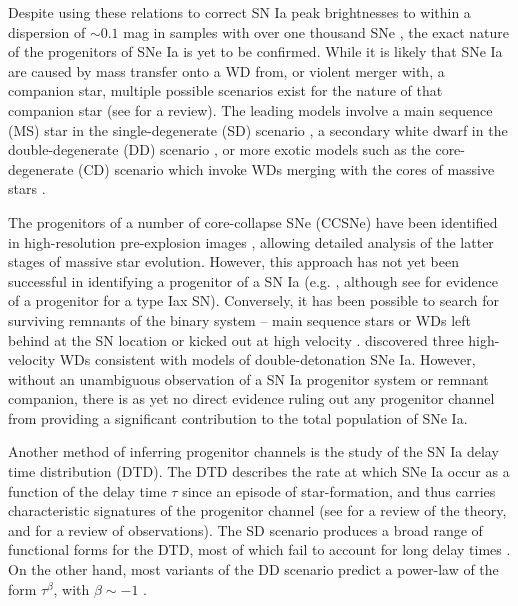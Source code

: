 \documentclass[fleqn,usenatbib]{mnras}
\begin{document}
Despite using these relations to correct SN Ia peak brightnesses to within a dispersion of $\sim 0.1$ mag in samples with over one thousand SNe \citep{Scolnic2018}, the exact nature of the progenitors of SNe Ia is yet to be confirmed. While it is likely that SNe Ia are caused by mass transfer onto a WD from, or violent merger with, a companion star, multiple possible scenarios exist for the nature of that companion star (see \citealt{Maoz2014} for a review). The leading models involve a main sequence (MS) star in the single-degenerate (SD) scenario \citep{Whelan1973,Nomoto1982}, a secondary white dwarf in the double-degenerate (DD) scenario \citep{Tutukov1976,Iben1984,Webbink1984}, or more exotic models such as the core-degenerate (CD) scenario which invoke WDs merging with the cores of massive stars \citep{Soker2019}. 

The progenitors of a number of core-collapse SNe (CCSNe) have been identified in high-resolution pre-explosion images \citep{Smartt2009,Eldridge2013}, allowing detailed analysis of the latter stages of massive star evolution. However, this approach has not yet been successful in identifying a progenitor of a SN Ia (e.g. \citealt{Graur2014a,Kelly2014,Graur2019}, although see \citet{McCully2014} for evidence of a progenitor for a type Iax SN). Conversely, it has been possible to search for surviving remnants of the binary system -- main sequence stars or WDs left behind at the SN location or kicked out at high velocity \citep[e.g.][]{Schaefer2012,RuizLapuente2012,Kerzendorf2018,Kerzendorf2019}. \citet{Shen2018} discovered three high-velocity WDs consistent with models of double-detonation SNe Ia. However, without an unambiguous observation of a SN Ia progenitor system or remnant companion, there is as yet no direct evidence ruling out any progenitor channel from providing a significant contribution to the total population of SNe Ia.

Another method of inferring progenitor channels is the study of the SN Ia delay time distribution (DTD). The DTD describes the rate at which SNe Ia occur as a function of the delay time $\tau$ since an episode of star-formation, and thus carries characteristic signatures of the progenitor channel (see \citealt{Wang2012} for a review of the theory, and \citet{Maoz2017} for a review of observations). The SD scenario produces a broad range of functional forms for the DTD, most of which fail to account for long delay times \citep{Graur2014}. On the other hand, most variants of the DD scenario predict a power-law of the form $\tau^{\beta}$, with $\beta \sim -1$ \citep[e.g][]{Ruiter2009,Mennekens2010}.
\end{document}
